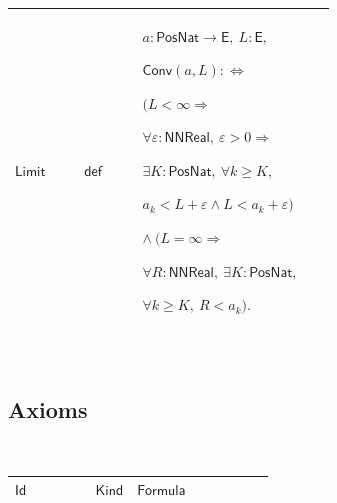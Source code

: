 \documentclass[12pt,reqno]{amsart}
\theoremstyle{blueplain}
\numberwithin{equation}{section}
\newlength{\DCTOneColumnBody}
\begin{document}
{\scriptsize \setlength{\parskip}{0pt}\nointerlineskip
\noindent 
\begin{tabular}{|@{}>{\centering\arraybackslash}m{0.19251\linewidth}|>{\centering\arraybackslash}m{0.16845\linewidth}|>{\centering\arraybackslash}m{0.53904\linewidth}|}
\hline
\hypertarget{def:Limit}{$\displaystyle \mathsf{Limit}$} & $\displaystyle 
\mathsf{def}$ & $\displaystyle a:\mathsf{PosNat}\to\mathsf{E},\ L:\mathsf{E},
$\par$\displaystyle \mathsf{Conv}(a,L):\Longleftrightarrow$\par$%
\displaystyle \bigl(L<\infty\Rightarrow$\par$\displaystyle %
\forall\varepsilon:\mathsf{NNReal},\ \varepsilon>0\Rightarrow$\par$%
\displaystyle \exists K:\mathsf{PosNat},\ \forall k\ge K,$\par$\displaystyle %
a_k<L+\varepsilon\land L<a_k+\varepsilon\bigr)$\par$\displaystyle \land\ %
\bigl(L=\infty\Rightarrow$\par$\displaystyle \forall R:\mathsf{NNReal},\
\exists K:\mathsf{PosNat},$\par$\displaystyle \forall k\ge K,\ R<a_k\bigr).$
\\ \hline
\end{tabular}%
}

{\scriptsize \ }

\subsection{\protect\scriptsize Axioms}

{\scriptsize {\ }}

{\scriptsize \setlength{\parskip}{0pt}\nointerlineskip
\noindent 
\begin{tabular}{|@{}>{\centering\arraybackslash}m{\DCTOneColumnBody}|}
\hline
$\displaystyle \mathsf{Axioms}$ \\ \hline
\end{tabular}%
}

{\scriptsize \setlength{\parskip}{0pt}\nointerlineskip
\noindent 
\begin{tabular}{|@{}>{\centering\arraybackslash}m{0.19251\linewidth}|>{\centering\arraybackslash}m{0.16845\linewidth}|>{\centering\arraybackslash}m{0.53904\linewidth}|}
\hline
$\displaystyle \mathsf{Id}$ & $\displaystyle \mathsf{Kind}$ & $\displaystyle 
\mathsf{Formula}$ \\ \hline
\end{tabular}%
}
\end{document}
